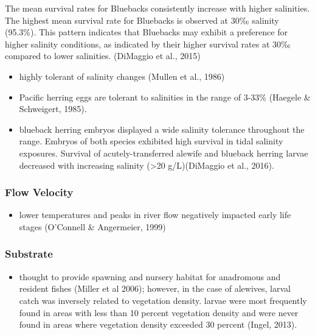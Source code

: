 \documentclass[
]{book}
\providecommand{\tightlist}{%
  \setlength{\itemsep}{0pt}\setlength{\parskip}{0pt}}
\begin{document}
The mean survival rates for Bluebacks consistently increase with higher salinities.
The highest mean survival rate for Bluebacks is observed at 30‰ salinity (95.3\%).
This pattern indicates that Bluebacks may exhibit a preference for higher salinity conditions, as indicated by their higher survival rates at 30‰ compared to lower salinities. (DiMaggio et al., 2015)

\begin{itemize}
\item
  highly tolerant of salinity changes (Mullen et al., 1986)
\item
  Pacific herring eggs are tolerant to salinities in the range of 3-33\% (Haegele \& Schweigert, 1985).
\item
  blueback herring embryos displayed a wide salinity tolerance throughout the range. Embryos of both species exhibited high survival in tidal salinity exposures. Survival of acutely-transferred alewife and blueback herring larvae decreased with increasing salinity (\textgreater20 g/L)(DiMaggio et al., 2016).
\end{itemize}

\hypertarget{flow-velocity-8}{%
\subsubsection{Flow Velocity}\label{flow-velocity-8}}

\begin{itemize}
\tightlist
\item
  lower temperatures and peaks in river flow negatively impacted early life stages (O'Connell \& Angermeier, 1999)
\end{itemize}

\hypertarget{substrate-8}{%
\subsubsection{Substrate}\label{substrate-8}}

\begin{itemize}
\tightlist
\item
  thought to provide spawning and nursery habitat for anadromous and resident fishes (Miller et al 2006); however, in the case of alewives, larval catch was inversely related to vegetation density. larvae were most frequently found in areas with less than 10 percent vegetation density and were never found in areas where vegetation density exceeded 30 percent (Ingel, 2013).
\end{itemize}
\end{document}
